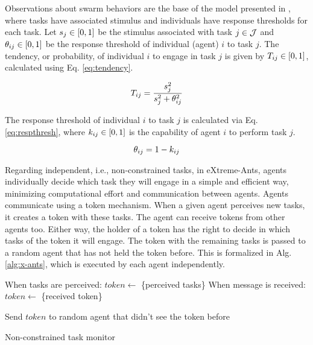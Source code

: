 Observations about swarm behaviors are the base of the model presented in \citep{Theraulaz+1998}, where tasks have associated stimulus %
and individuals have response thresholds for each task. Let $s_j \in [0,1]$ be the stimulus associated with task $j \in \mathcal{J}$ and $\theta_{ij} \in [0,1]$ be the response threshold of individual (agent) $i$ to task $j$. The tendency, or probability, of individual $i$ to engage in task $j$ is given by $T_{ij} \in [0,1]$, calculated using Eq. \ref{eq:tendency}.

\begin{equation}
\label{eq:tendency}
T_{ij} = \frac{s_j^2}{s_j^2 + \theta_{ij}^2}
\end{equation}

The response threshold  of individual $i$ to task $j$ is calculated via Eq. \ref{eq:respthresh}, where $k_{ij} \in [0,1]$ is the capability of agent $i$ to perform task $j$.

\begin{equation}
\label{eq:respthresh}
\theta_{ij} = 1 - k_{ij}
\end{equation}

Regarding independent, i.e., non-constrained tasks, in eXtreme-Ants, agents individually decide which task they will engage in a simple and efficient way, minimizing computational effort and communication between agents. Agents communicate using a token mechanism. When a given agent perceives new tasks, it creates a token with these tasks. The agent can receive tokens from other agents too. Either way, the holder of a token has the right to decide in which tasks of the token it will engage. The token with the remaining tasks is passed to a random agent that has not held the token before. This is formalized in Alg. \ref{alg:x-ants}, which is executed by each agent independently.


\begin{algorithm}[ht]
\begin{algorithmic}
\STATE When tasks are perceived: $token \gets$ \{perceived tasks\}
\STATE When message is received: $token \gets$ \{received token\}

\ENDIF
\ENDFOR

\STATE Send $token$ to random agent that didn't see the token before
\end{algorithmic}
\caption{Non-constrained task monitor}
\label{alg:x-ants}
\end{algorithm}

